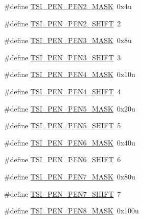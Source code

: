 \begin{DoxyCompactItemize}
\item 
\#define \hyperlink{group___t_s_i___register___masks_ga851b1c95858be546cf4c5e1975d51823}{T\+S\+I\+\_\+\+P\+E\+N\+\_\+\+P\+E\+N2\+\_\+\+M\+A\+SK}~0x4u
\item 
\#define \hyperlink{group___t_s_i___register___masks_ga0b7c4038dd06f31b5acfbd2be8ff65cf}{T\+S\+I\+\_\+\+P\+E\+N\+\_\+\+P\+E\+N2\+\_\+\+S\+H\+I\+FT}~2
\item 
\#define \hyperlink{group___t_s_i___register___masks_gaaa7f4499e9502211aa3f701ff76cbfd5}{T\+S\+I\+\_\+\+P\+E\+N\+\_\+\+P\+E\+N3\+\_\+\+M\+A\+SK}~0x8u
\item 
\#define \hyperlink{group___t_s_i___register___masks_gaae95322b203c2d62343f500b0c2a5996}{T\+S\+I\+\_\+\+P\+E\+N\+\_\+\+P\+E\+N3\+\_\+\+S\+H\+I\+FT}~3
\item 
\#define \hyperlink{group___t_s_i___register___masks_ga84dcc37edb4ed1b883f85b639092a9cb}{T\+S\+I\+\_\+\+P\+E\+N\+\_\+\+P\+E\+N4\+\_\+\+M\+A\+SK}~0x10u
\item 
\#define \hyperlink{group___t_s_i___register___masks_gab5aa48e30efdd8e8f431087e7c115ef0}{T\+S\+I\+\_\+\+P\+E\+N\+\_\+\+P\+E\+N4\+\_\+\+S\+H\+I\+FT}~4
\item 
\#define \hyperlink{group___t_s_i___register___masks_ga6fa4ed2566d9f9a2ea99816a0f362284}{T\+S\+I\+\_\+\+P\+E\+N\+\_\+\+P\+E\+N5\+\_\+\+M\+A\+SK}~0x20u
\item 
\#define \hyperlink{group___t_s_i___register___masks_gac570df6433fa24603f53ef4ec29d1462}{T\+S\+I\+\_\+\+P\+E\+N\+\_\+\+P\+E\+N5\+\_\+\+S\+H\+I\+FT}~5
\item 
\#define \hyperlink{group___t_s_i___register___masks_ga6ea52be49c67caff3c6aec70425f6da7}{T\+S\+I\+\_\+\+P\+E\+N\+\_\+\+P\+E\+N6\+\_\+\+M\+A\+SK}~0x40u
\item 
\#define \hyperlink{group___t_s_i___register___masks_ga3c47b02418ccd8b31132ecfdd45bdd9c}{T\+S\+I\+\_\+\+P\+E\+N\+\_\+\+P\+E\+N6\+\_\+\+S\+H\+I\+FT}~6
\item 
\#define \hyperlink{group___t_s_i___register___masks_ga647e31fe5802735f69fa70e752b881b3}{T\+S\+I\+\_\+\+P\+E\+N\+\_\+\+P\+E\+N7\+\_\+\+M\+A\+SK}~0x80u
\item 
\#define \hyperlink{group___t_s_i___register___masks_ga8a68b8de1664c9980b3f742c8a1427c2}{T\+S\+I\+\_\+\+P\+E\+N\+\_\+\+P\+E\+N7\+\_\+\+S\+H\+I\+FT}~7
\item 
\#define \hyperlink{group___t_s_i___register___masks_ga98c6aab58655c83b856f21f804c7c439}{T\+S\+I\+\_\+\+P\+E\+N\+\_\+\+P\+E\+N8\+\_\+\+M\+A\+SK}~0x100u
\item 

\end{DoxyCompactItemize}
